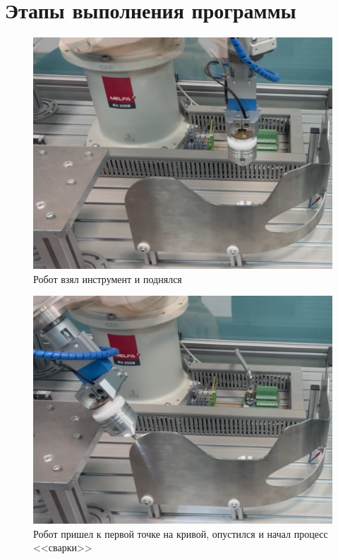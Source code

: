 \documentclass[a4paper, 12pt]{article}
\begin{document}
    \section{Этапы выполнения программы}
    \begin{figure}[H]
        \centering
        \includegraphics[scale=0.55]{take.png}
        \captionsetup{skip=0pt}
        \caption{Робот взял инструмент и поднялся}
        \label{fig:take}
    \end{figure}
    \begin{figure}[H]
        \centering
        \includegraphics[scale=0.55]{scr1.png}
        \captionsetup{skip=0pt}
        \caption{Робот пришел к первой точке на кривой, опустился и начал процесс <<сварки>>}
        \label{fig:start}
    \end{figure}
\end{document}
